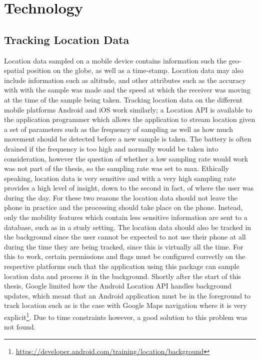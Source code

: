 \section{Technology}

\subsection{Tracking Location Data}
Location data sampled on a mobile device contains information such the geo-spatial position on the globe, as well as a time-stamp. Location data may also include information such as altitude, and other attributes such as the accuracy with with the sample was made and the speed at which the receiver was moving at the time of the sample being taken. Tracking location data on the different mobile platforms Android and iOS work similarly; a Location API is available to the application programmer which allows the application to stream location given a set of parameters such as the frequency of sampling as well as how much movement should be detected before a new sample is taken. The battery is often drained if the frequency is too high and normally would be taken into consideration, however the question of whether a low sampling rate would work was not part of the thesis, so the sampling rate was set to max. Ethically speaking, location data is very sensitive and with a very high sampling rate provides a high level of insight, down to the second in fact, of where the user was during the day. For these two reasons the location data should not leave the phone in practice and the processing should take place on the phone. Instead, only the mobility features which contain less sensitive information are sent to a database, such as in a study setting. The location data should also be tracked in the background since the user cannot be expected to not use their phone at all during the time they are being tracked, since this is virtually all the time. For this to work, certain permissions and flags must be configured correctly on the respective platforms such that the application using this package can sample location data and process it in the background. Shortly after the start of this thesis, Google limited how the Android Location API handles background updates, which meant that an Android application must be in the foreground to track location such as is the case with Google Maps navigation where it is very explicit\footnote{\url{https://developer.android.com/training/location/background}}. Due to time constraints however, a good solution to this problem was not found. 

